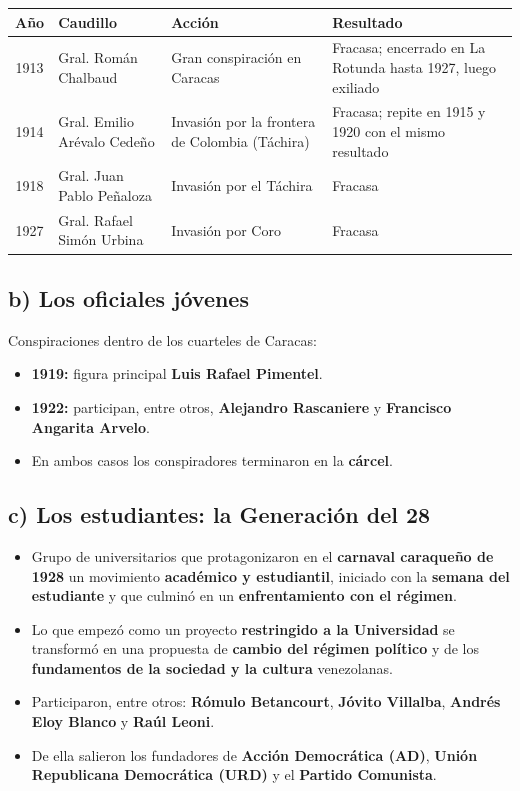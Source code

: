 \documentclass[12pt, letterpaper]{article}
\begin{document}
{\small
\begin{tabular}{@{}c >{\raggedright\arraybackslash}p{2.7cm}
                    >{\raggedright\arraybackslash}p{5.5cm}
                    >{\raggedright\arraybackslash}p{6.3cm}@{}}
  \toprule
  \textbf{Año} & \textbf{Caudillo} & \textbf{Acción} & \textbf{Resultado} \\
  \midrule
  1913 & Gral. Román Chalbaud &
  Gran conspiración en Caracas &
  Fracasa; encerrado en La Rotunda hasta 1927, luego exiliado \\
  1914 & Gral. Emilio Arévalo Cedeño &
  Invasión por la frontera de Colombia (Táchira) &
  Fracasa; repite en 1915 y 1920 con el mismo resultado \\
  1918 & Gral. Juan Pablo Peñaloza &
  Invasión por el Táchira &
  Fracasa \\
  1927 & Gral. Rafael Simón Urbina &
  Invasión por Coro &
  Fracasa \\
  \bottomrule
\end{tabular}
}

\subsection*{b) Los oficiales jóvenes}
Conspiraciones dentro de los cuarteles de Caracas:
\begin{itemize}[leftmargin=*, itemsep=3pt]
  \item \textbf{1919:} figura principal \textbf{Luis Rafael Pimentel}.
  \item \textbf{1922:} participan, entre otros, \textbf{Alejandro Rascaniere} y
        \textbf{Francisco Angarita Arvelo}.
  \item En ambos casos los conspiradores terminaron en la \textbf{cárcel}.
\end{itemize}

\subsection*{c) Los estudiantes: la Generación del 28}
\begin{itemize}[leftmargin=*, itemsep=3pt]
  \item Grupo de universitarios que protagonizaron en el \textbf{carnaval
        caraqueño de 1928} un movimiento \textbf{académico y estudiantil},
        iniciado con la \textbf{semana del estudiante} y que culminó en un
        \textbf{enfrentamiento con el régimen}.
  \item Lo que empezó como un proyecto \textbf{restringido a la Universidad} se
        transformó en una propuesta de \textbf{cambio del régimen político} y de
        los \textbf{fundamentos de la sociedad y la cultura} venezolanas.
  \item Participaron, entre otros: \textbf{Rómulo Betancourt}, \textbf{Jóvito
        Villalba}, \textbf{Andrés Eloy Blanco} y \textbf{Raúl Leoni}.
  \item De ella salieron los fundadores de \textbf{Acción Democrática (AD)},
        \textbf{Unión Republicana Democrática (URD)} y el \textbf{Partido
        Comunista}.
\end{itemize}
\end{document}

